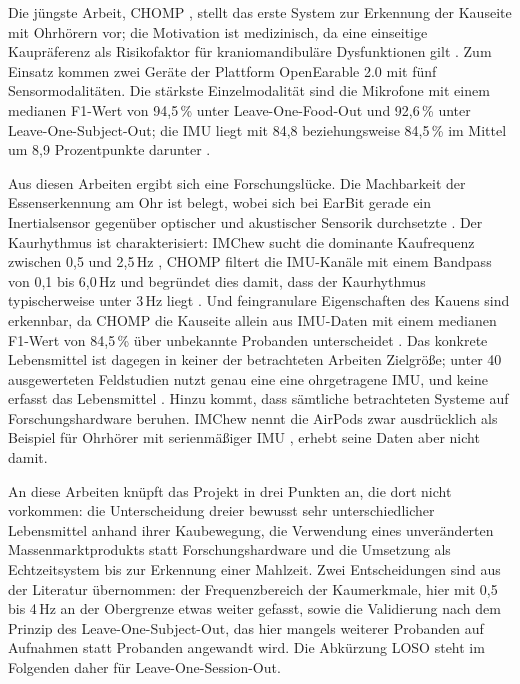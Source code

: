 \documentclass[11pt]{article}
\begin{document}
Die jüngste Arbeit, CHOMP \citep{Hummel2026}, stellt das erste System zur Erkennung der
Kauseite mit Ohrhörern vor; die Motivation ist medizinisch, da eine einseitige Kaupräferenz
als Risikofaktor für kraniomandibuläre Dysfunktionen gilt \citep[S.~1]{Hummel2026}. Zum
Einsatz kommen zwei Geräte der Plattform OpenEarable 2.0 mit fünf Sensormodalitäten. Die
stärkste Einzelmodalität sind die Mikrofone mit einem medianen F1-Wert von 94,5\,\% unter
Leave-One-Food-Out und 92,6\,\% unter Leave-One-Subject-Out; die IMU liegt mit 84,8
beziehungsweise 84,5\,\% im Mittel um 8,9 Prozentpunkte darunter
\citep[S.~17]{Hummel2026}.

Aus diesen Arbeiten ergibt sich eine Forschungslücke. Die Machbarkeit der Essenserkennung
am Ohr ist belegt, wobei sich bei EarBit gerade ein Inertialsensor gegenüber optischer und
akustischer Sensorik durchsetzte \citep[S.~3]{Bedri2017}. Der Kaurhythmus ist
charakterisiert: IMChew sucht die dominante Kaufrequenz zwischen 0,5 und 2,5\,Hz
\citep[S.~31]{Ketmalasiri2024}, CHOMP filtert die IMU-Kanäle mit einem Bandpass von 0,1 bis
6,0\,Hz und begründet dies damit, dass der Kaurhythmus typischerweise unter 3\,Hz liegt
\citep[S.~10]{Hummel2026}. Und feingranulare Eigenschaften des Kauens sind erkennbar, da
CHOMP die Kauseite allein aus IMU-Daten mit einem medianen F1-Wert von 84,5\,\% über
unbekannte Probanden unterscheidet \citep[S.~17]{Hummel2026}. Das konkrete Lebensmittel ist
dagegen in keiner der betrachteten Arbeiten Zielgröße; unter 40 ausgewerteten Feldstudien
nutzt genau eine eine ohrgetragene IMU, und keine erfasst das Lebensmittel
\citep[S.~9--10]{Bell2020}. Hinzu kommt, dass sämtliche betrachteten Systeme auf
Forschungshardware beruhen. IMChew nennt die AirPods zwar ausdrücklich als Beispiel für
Ohrhörer mit serienmäßiger IMU \citep[S.~29]{Ketmalasiri2024}, erhebt seine Daten aber
nicht damit.

An diese Arbeiten knüpft das Projekt in drei Punkten an, die dort nicht vorkommen: die
Unterscheidung dreier bewusst sehr unterschiedlicher Lebensmittel anhand ihrer
Kaubewegung, die Verwendung eines unveränderten Massenmarktprodukts statt
Forschungshardware und die Umsetzung als Echtzeitsystem bis zur Erkennung einer Mahlzeit.
Zwei Entscheidungen sind aus der Literatur übernommen: der Frequenzbereich der
Kaumerkmale, hier mit 0,5 bis 4\,Hz an der Obergrenze etwas weiter gefasst, sowie die
Validierung nach dem Prinzip des Leave-One-Subject-Out, das hier mangels weiterer Probanden
auf Aufnahmen statt Probanden angewandt wird. Die Abkürzung LOSO steht im Folgenden daher
für Leave-One-Session-Out.
\end{document}

